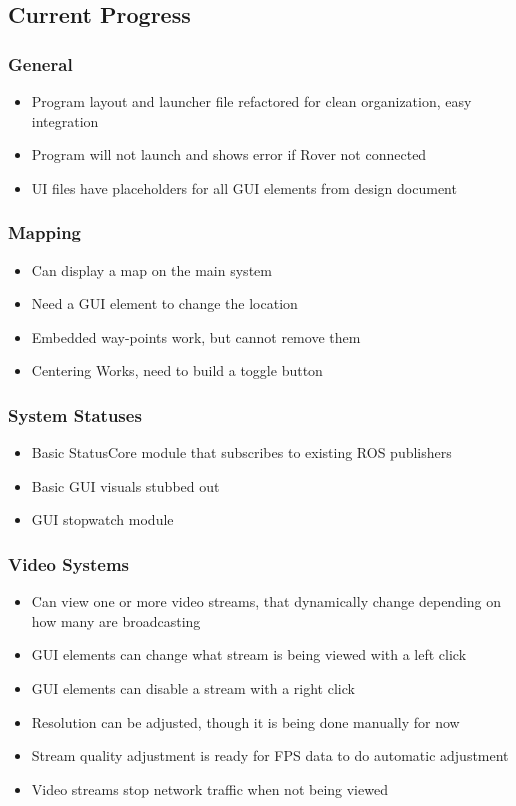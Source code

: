 \subsection{Current Progress}
\subsubsection{General}
\begin{itemize}
\item Program layout and launcher file refactored for clean organization, easy integration
\item Program will not launch and shows error if Rover not connected
\item UI files have placeholders for all GUI elements from design document
\end{itemize}

\subsubsection{Mapping}
\begin{itemize}
\item Can display a map on the main system
\item Need a GUI element to change the location
\item Embedded way-points work, but cannot remove them
\item Centering Works, need to build a toggle button
\end{itemize}

\subsubsection{System Statuses}
\begin{itemize}
\item Basic StatusCore module that subscribes to existing ROS publishers
\item Basic GUI visuals stubbed out
\item GUI stopwatch module
\end{itemize}

\subsubsection{Video Systems}
\begin{itemize}
\item Can view one or more video streams, that dynamically change depending on how many are broadcasting
\item GUI elements can change what stream is being viewed with a left click
\item GUI elements can disable a stream with a right click
\item Resolution can be adjusted, though it is being done manually for now
\item Stream quality adjustment is ready for FPS data to do automatic adjustment
\item Video streams stop network traffic when not being viewed
\end{itemize}